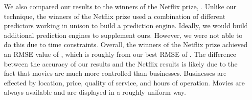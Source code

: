 We also compared our results to the winners of the Netflix prize, \cite{netprize}. Unlike our technique, the winners of the Netflix prize used a combination of different predictors working in unison to build a prediction engine. Ideally, we would build additional prediction engines to supplement ours. However, we were not able to do this due to time constraints. Overall, the winners of the Netflix prize achieved an RMSE value of \bestNetflixRMSE, which is roughly \netDiff from our best RMSE of \bestRMSE. The difference between the accuracy of our results and the Netflix results is likely due to the fact that movies are much more controlled than businesses. Businesses are effected by location, price, quality of service, and hours of operation. Movies are always available and are displayed in a roughly uniform way. 

